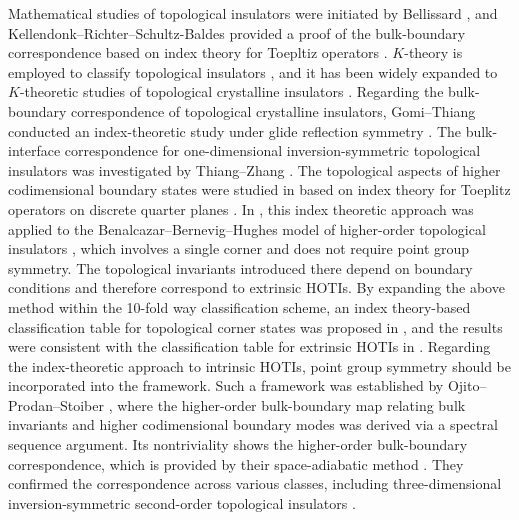 \documentclass{amsart}
\theoremstyle{plain}
\theoremstyle{definition}
\theoremstyle{remark}
\begin{document}
Mathematical studies of topological insulators were initiated by Bellissard \cite{BvES94}, and Kellendonk--Richter--Schultz-Baldes provided a proof of the bulk-boundary correspondence based on index theory for Toepltiz operators \cite{KRSB02}.
$K$-theory is employed to classify topological insulators \cite{Kit09}, and it has been widely expanded to $K$-theoretic studies of topological crystalline insulators \cite{SS14,Ku15,SSG17,GT19a,OSS19,GKT21}.
Regarding the bulk-boundary correspondence of topological crystalline insulators, Gomi--Thiang conducted an index-theoretic study under glide reflection symmetry \cite{GT19b}.
The bulk-interface correspondence for one-dimensional inversion-symmetric topological insulators was investigated by Thiang--Zhang \cite{TZ23}.
The topological aspects of higher codimensional boundary states were studied in \cite{Hayashi2} based on index theory for Toeplitz operators on discrete quarter planes \cite{Sim67,DH71,CDS72,Dud77b,Pa90}.
In \cite{Hayashi3}, this index theoretic approach was applied to the Benalcazar--Bernevig--Hughes model of higher-order topological insulators \cite{BBH17a}, which involves a single corner and does not require point group symmetry.
The topological invariants introduced there depend on boundary conditions and therefore correspond to extrinsic HOTIs.
By expanding the above method within the 10-fold way classification scheme, an index theory-based classification table for topological corner states was proposed in \cite{Hayashi4}, and the results were consistent with the classification table for extrinsic HOTIs in \cite{Geier18}.
Regarding the index-theoretic approach to intrinsic HOTIs, point group symmetry should be incorporated into the framework.
Such a framework was established by Ojito--Prodan--Stoiber \cite{OPS24a}, where the higher-order bulk-boundary map relating bulk invariants and higher codimensional boundary modes was derived via a spectral sequence argument.
Its nontriviality shows the higher-order bulk-boundary correspondence, which is provided by their space-adiabatic method \cite{OPS24b}.
They confirmed the correspondence across various classes, including three-dimensional inversion-symmetric second-order topological insulators \cite{OPS24a}.
\end{document}
